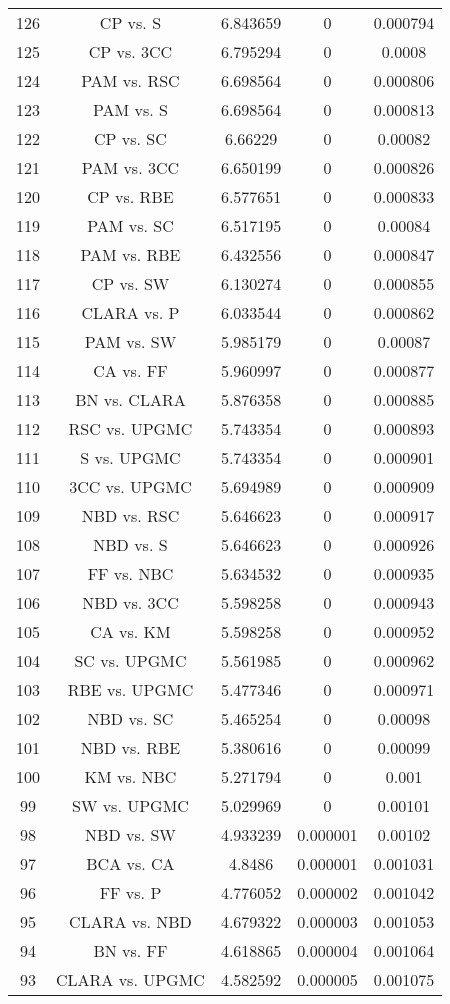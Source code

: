 \documentclass[a4paper,10pt]{article}
\begin{document}
\begin{landscape}
\begin{table}[!htp]
\begin{tabular}{ccccc}
126&CP vs. S&6.843659&0&0.000794\\
125&CP vs. 3CC&6.795294&0&0.0008\\
124&PAM vs. RSC&6.698564&0&0.000806\\
123&PAM vs. S&6.698564&0&0.000813\\
122&CP vs. SC&6.66229&0&0.00082\\
121&PAM vs. 3CC&6.650199&0&0.000826\\
120&CP vs. RBE&6.577651&0&0.000833\\
119&PAM vs. SC&6.517195&0&0.00084\\
118&PAM vs. RBE&6.432556&0&0.000847\\
117&CP vs. SW&6.130274&0&0.000855\\
116&CLARA vs. P&6.033544&0&0.000862\\
115&PAM vs. SW&5.985179&0&0.00087\\
114&CA vs. FF&5.960997&0&0.000877\\
113&BN vs. CLARA&5.876358&0&0.000885\\
112&RSC vs. UPGMC&5.743354&0&0.000893\\
111&S vs. UPGMC&5.743354&0&0.000901\\
110&3CC vs. UPGMC&5.694989&0&0.000909\\
109&NBD vs. RSC&5.646623&0&0.000917\\
108&NBD vs. S&5.646623&0&0.000926\\
107&FF vs. NBC&5.634532&0&0.000935\\
106&NBD vs. 3CC&5.598258&0&0.000943\\
105&CA vs. KM&5.598258&0&0.000952\\
104&SC vs. UPGMC&5.561985&0&0.000962\\
103&RBE vs. UPGMC&5.477346&0&0.000971\\
102&NBD vs. SC&5.465254&0&0.00098\\
101&NBD vs. RBE&5.380616&0&0.00099\\
100&KM vs. NBC&5.271794&0&0.001\\
99&SW vs. UPGMC&5.029969&0&0.00101\\
98&NBD vs. SW&4.933239&0.000001&0.00102\\
97&BCA vs. CA&4.8486&0.000001&0.001031\\
96&FF vs. P&4.776052&0.000002&0.001042\\
95&CLARA vs. NBD&4.679322&0.000003&0.001053\\
94&BN vs. FF&4.618865&0.000004&0.001064\\
93&CLARA vs. UPGMC&4.582592&0.000005&0.001075\\

\end{tabular}
\end{table}
\end{landscape}
\end{document}
